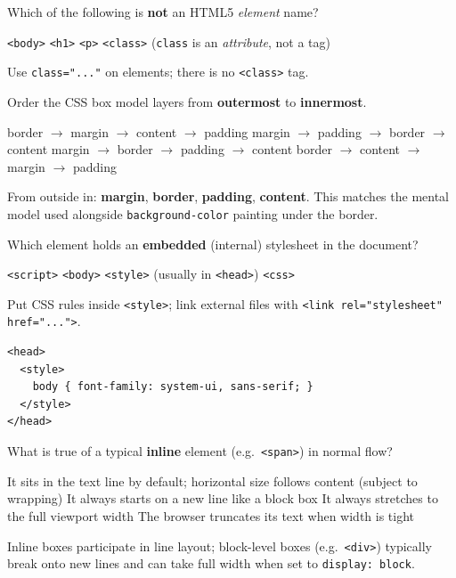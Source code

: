 \question[4]
Which of the following is \textbf{not} an HTML5 \emph{element} name?
\begin{choices}
  \choice \texttt{<body>}
  \choice \texttt{<h1>}
  \choice \texttt{<p>}
  \CorrectChoice \texttt{<class>} (\texttt{class} is an \emph{attribute}, not a tag)
\end{choices}
\begin{solution}
  Use \texttt{class="..."} on elements; there is no \texttt{<class>} tag.
\end{solution}

\question[4]
Order the CSS box model layers from \textbf{outermost} to \textbf{innermost}.
\begin{choices}
  \choice border $\rightarrow$ margin $\rightarrow$ content $\rightarrow$ padding
  \choice margin $\rightarrow$ padding $\rightarrow$ border $\rightarrow$ content
  \CorrectChoice margin $\rightarrow$ border $\rightarrow$ padding $\rightarrow$ content
  \choice border $\rightarrow$ content $\rightarrow$ margin $\rightarrow$ padding
\end{choices}
\begin{solution}
  From outside in: \textbf{margin}, \textbf{border}, \textbf{padding}, \textbf{content}. This matches the mental model used alongside \texttt{background-color} painting under the border.
\end{solution}

\question[4]
Which element holds an \textbf{embedded} (internal) stylesheet in the document?
\begin{choices}
  \choice \texttt{<script>}
  \choice \texttt{<body>}
  \CorrectChoice \texttt{<style>} (usually in \texttt{<head>})
  \choice \texttt{<css>}
\end{choices}
\begin{solution}
  Put CSS rules inside \texttt{<style>}; link external files with \texttt{<link rel="stylesheet" href="...">}.
\begin{lstlisting}[style=htmlinline]
<head>
  <style>
    body { font-family: system-ui, sans-serif; }
  </style>
</head>
\end{lstlisting}
\end{solution}

\question[4]
What is true of a typical \textbf{inline} element (e.g.\ \texttt{<span>}) in normal flow?
\begin{choices}
  \CorrectChoice It sits in the text line by default; horizontal size follows content (subject to wrapping)
  \choice It always starts on a new line like a block box
  \choice It always stretches to the full viewport width
  \choice The browser truncates its text when width is tight
\end{choices}
\begin{solution}
  Inline boxes participate in line layout; block-level boxes (e.g.\ \texttt{<div>}) typically break onto new lines and can take full width when set to \texttt{display: block}.
\end{solution}


